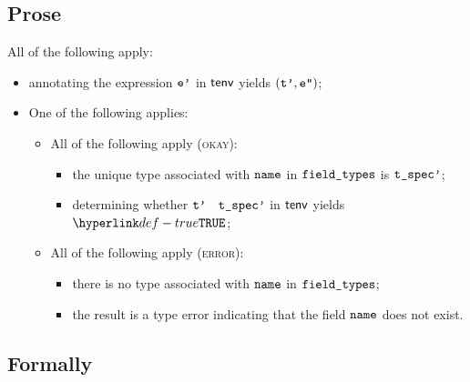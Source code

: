 \subsection{Prose}
All of the following apply:
\begin{itemize}
  \item annotating the expression $\texttt{e'}$ in $\textsf{tenv}$ yields $(\texttt{t'}, \texttt{e''})$\ProseOrTypeError;
  \item One of the following applies:
  \begin{itemize}
    \item All of the following apply (\textsc{okay}):
    \begin{itemize}
      \item the unique type associated with $\texttt{name}$ in $\texttt{field\_types}$ is $\texttt{t\_spec'}$;
      \item determining whether $\texttt{t'}$ \typesatisfies\ $\texttt{t\_spec'}$ in $\textsf{tenv}$ yields $\True$\ProseOrTypeError;
    \end{itemize}

    \item All of the following apply (\textsc{error}):
    \begin{itemize}
      \item there is no type associated with $\texttt{name}$ in $\texttt{field\_types}$;
      \item the result is a type error indicating that the field $\texttt{name}$ does not exist.
    \end{itemize}
  \end{itemize}
\end{itemize}

\subsection{Formally}


